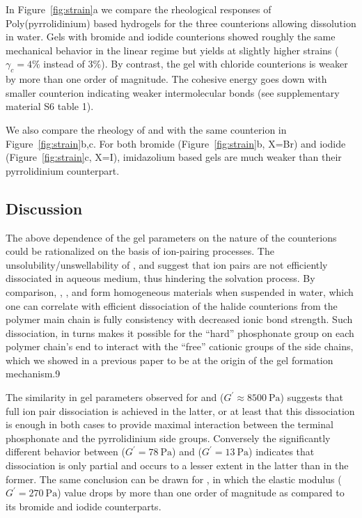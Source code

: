 \documentclass[journal=jacsat,manuscript=article]{achemso}
\begin{document}
In Figure~\ref{fig:strain}a we compare the rheological responses of Poly(pyrrolidinium) based hydrogels for the three counterions allowing dissolution in water. Gels with bromide and iodide counterions showed roughly the same mechanical behavior in the linear regime but  yields at slightly higher strains ($\gamma_c=4\%$ instead of $3\%$). By contrast, the gel with chloride counterions is weaker by more than one order of magnitude. The cohesive energy goes down with smaller counterion indicating weaker intermolecular bonds (see supplementary material S6 table 1).

We also compare the rheology of  and  with the same counterion  in Figure~\ref{fig:strain}b,c. For both bromide (Figure~\ref{fig:strain}b, X=Br) and iodide (Figure~\ref{fig:strain}c, X=I), imidazolium based gels are much weaker than their pyrrolidinium counterpart.

\subsection{Discussion}

The above dependence of the gel parameters on the nature of the counterions could be rationalized on the basis of ion-pairing processes. The unsolubility/unswellability of ,  and  suggest that ion pairs are not efficiently dissociated in aqueous medium, thus hindering the solvation process. By comparison, , ,  and  form homogeneous materials when suspended in water, which one can correlate with efficient dissociation of the halide counterions from the polymer main chain is fully consistency with decreased ionic bond strength. Such dissociation, in turns makes it possible for the ``hard'' phosphonate group on each polymer chain's end to interact with the ``free'' cationic groups of the side chains, which we showed in a previous paper to be at the origin of the gel formation mechanism.9

The similarity in gel parameters observed for  and  ($G^\prime\approx\SI{8500}{\pascal}$) suggests that full ion pair dissociation is achieved in the latter, or at least that this dissociation is enough in both cases to provide maximal interaction between the terminal phosphonate and the pyrrolidinium side groups. Conversely the significantly different behavior between  ($G^\prime= \SI{78}{\pascal}$) and  ($G^\prime= \SI{13}{\pascal}$) indicates that dissociation is only partial and occurs to a lesser extent in the latter than in the former. The same conclusion can be drawn for , in which the elastic modulus ($G^\prime= \SI{270}{\pascal}$) value drops by more than one order of magnitude as compared to its bromide and iodide counterparts.
\end{document}
